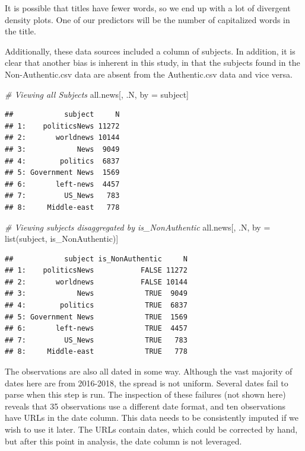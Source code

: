 \documentclass[
]{article}
\newenvironment{Shaded}{\begin{snugshade}}{\end{snugshade}}
\newcommand{\CommentTok}[1]{\textcolor[rgb]{0.56,0.35,0.01}{\textit{#1}}}
\newcommand{\FunctionTok}[1]{\textcolor[rgb]{0.00,0.00,0.00}{#1}}
\newcommand{\NormalTok}[1]{#1}
\newcommand{\OtherTok}[1]{\textcolor[rgb]{0.56,0.35,0.01}{#1}}
\begin{document}
It is possible that titles have fewer words, so we end up with a lot of
divergent density plots. One of our predictors will be the number of
capitalized words in the title.

\pagebreak

Additionally, these data sources included a column of subjects. In
addition, it is clear that another bias is inherent in this study, in
that the subjects found in the Non-Authentic.csv data are absent from
the Authentic.csv data and vice versa.

\begin{Shaded}
\begin{Highlighting}[]
\CommentTok{\# Viewing all Subjects}
\NormalTok{all.news[, .N, by }\OtherTok{=}\NormalTok{ subject]}
\end{Highlighting}
\end{Shaded}

\begin{verbatim}
##            subject     N
## 1:    politicsNews 11272
## 2:       worldnews 10144
## 3:            News  9049
## 4:        politics  6837
## 5: Government News  1569
## 6:       left-news  4457
## 7:         US_News   783
## 8:     Middle-east   778
\end{verbatim}

\begin{Shaded}
\begin{Highlighting}[]
\CommentTok{\# Viewing subjects disaggregated by is\_NonAuthentic}
\NormalTok{all.news[, .N, by }\OtherTok{=} \FunctionTok{list}\NormalTok{(subject, is\_NonAuthentic)]}
\end{Highlighting}
\end{Shaded}

\begin{verbatim}
##            subject is_NonAuthentic     N
## 1:    politicsNews           FALSE 11272
## 2:       worldnews           FALSE 10144
## 3:            News            TRUE  9049
## 4:        politics            TRUE  6837
## 5: Government News            TRUE  1569
## 6:       left-news            TRUE  4457
## 7:         US_News            TRUE   783
## 8:     Middle-east            TRUE   778
\end{verbatim}

The observations are also all dated in some way. Although the vast
majority of dates here are from 2016-2018, the spread is not uniform.
Several dates fail to parse when this step is run. The inspection of
these failures (not shown here) reveals that 35 observations use a
different date format, and ten observations have URLs in the date
column. This data needs to be consistently imputed if we wish to use it
later. The URLs contain dates, which could be corrected by hand, but
after this point in analysis, the date column is not leveraged.
\end{document}
